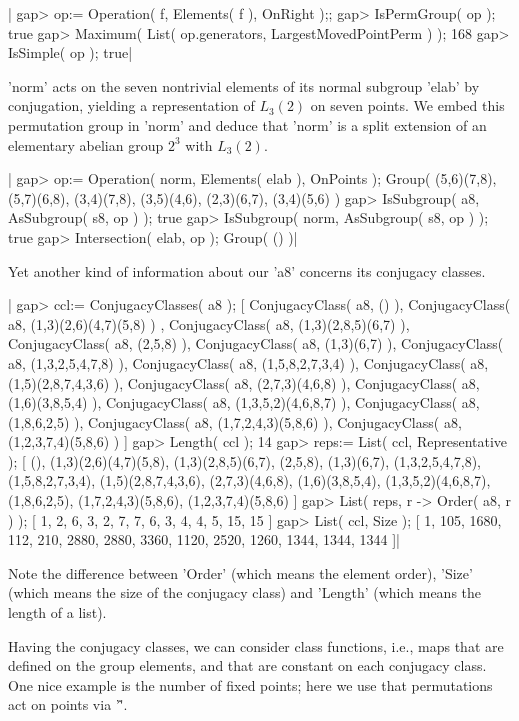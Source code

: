 |    gap> op:= Operation( f, Elements( f ), OnRight );;
    gap> IsPermGroup( op );
    true
    gap> Maximum( List( op.generators, LargestMovedPointPerm ) );
    168
    gap> IsSimple( op );
    true|

'norm'  acts  on the seven  nontrivial elements  of its  normal  subgroup
'elab' by  conjugation,  yielding a  representation of $L_3(2)$  on seven
points.  We embed this permutation group in 'norm' and deduce that 'norm'
is a split extension of an elementary abelian group $2^3$ with $L_3(2)$.

|    gap> op:= Operation( norm, Elements( elab ), OnPoints );
    Group( (5,6)(7,8), (5,7)(6,8), (3,4)(7,8), (3,5)(4,6), (2,3)(6,7),
    (3,4)(5,6) )
    gap> IsSubgroup(   a8, AsSubgroup( s8, op ) );
    true
    gap> IsSubgroup( norm, AsSubgroup( s8, op ) );
    true
    gap> Intersection( elab, op );
    Group( () )|

Yet another kind of  information about our 'a8'  concerns  its  conjugacy
classes.

|    gap> ccl:= ConjugacyClasses( a8 );
    [ ConjugacyClass( a8, () ), ConjugacyClass( a8, (1,3)(2,6)(4,7)(5,8) )
        , ConjugacyClass( a8, (1,3)(2,8,5)(6,7) ),
      ConjugacyClass( a8, (2,5,8) ), ConjugacyClass( a8, (1,3)(6,7) ),
      ConjugacyClass( a8, (1,3,2,5,4,7,8) ),
      ConjugacyClass( a8, (1,5,8,2,7,3,4) ),
      ConjugacyClass( a8, (1,5)(2,8,7,4,3,6) ),
      ConjugacyClass( a8, (2,7,3)(4,6,8) ),
      ConjugacyClass( a8, (1,6)(3,8,5,4) ),
      ConjugacyClass( a8, (1,3,5,2)(4,6,8,7) ),
      ConjugacyClass( a8, (1,8,6,2,5) ),
      ConjugacyClass( a8, (1,7,2,4,3)(5,8,6) ),
      ConjugacyClass( a8, (1,2,3,7,4)(5,8,6) ) ]
    gap> Length( ccl );
    14
    gap> reps:= List( ccl, Representative );
    [ (), (1,3)(2,6)(4,7)(5,8), (1,3)(2,8,5)(6,7), (2,5,8), (1,3)(6,7),
      (1,3,2,5,4,7,8), (1,5,8,2,7,3,4), (1,5)(2,8,7,4,3,6),
      (2,7,3)(4,6,8), (1,6)(3,8,5,4), (1,3,5,2)(4,6,8,7), (1,8,6,2,5),
      (1,7,2,4,3)(5,8,6), (1,2,3,7,4)(5,8,6) ]
    gap> List( reps, r -> Order( a8, r ) );
    [ 1, 2, 6, 3, 2, 7, 7, 6, 3, 4, 4, 5, 15, 15 ]
    gap> List( ccl, Size );
    [ 1, 105, 1680, 112, 210, 2880, 2880, 3360, 1120, 2520, 1260, 1344,
      1344, 1344 ]|

Note the  difference  between  'Order'  (which means the  element order),
'Size' (which means the size of the conjugacy  class) and 'Length' (which
means the length of a list).

Having the conjugacy classes, we can consider class functions, i.e., maps
that  are defined  on the group elements, and  that are constant on  each
conjugacy class.  One nice example is the number of fixed points; here we
use that permutations act on points via '\^'.

